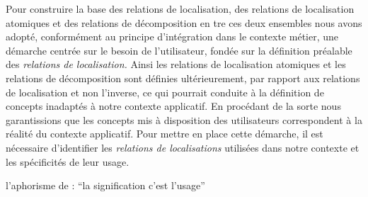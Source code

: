 Pour construire la base des relations de localisation, des relations
de localisation atomiques et des relations de décomposition en tre ces
deux ensembles nous avons adopté, conformément au principe
d'intégration dans le contexte métier, une démarche centrée sur le
besoin de l'utilisateur, \ie fondée sur la définition préalable des
\emph{relations de localisation.} Ainsi les relations de localisation
atomiques et les relations de décomposition sont définies
ultérieurement, par rapport aux relations de localisation et non
l'inverse, ce qui pourrait conduite à la définition de concepts
inadaptés à notre contexte applicatif.  En procédant de la sorte nous
garantissions que les concepts mis à disposition des utilisateurs
correspondent à la réalité du contexte applicatif. Pour mettre en
place cette démarche, il est nécessaire d'identifier les
\emph{relations de localisations} utilisées dans notre contexte et les
spécificités de leur usage.

l'aphorisme de  : \enquote{la signification c'est
  l'usage}


